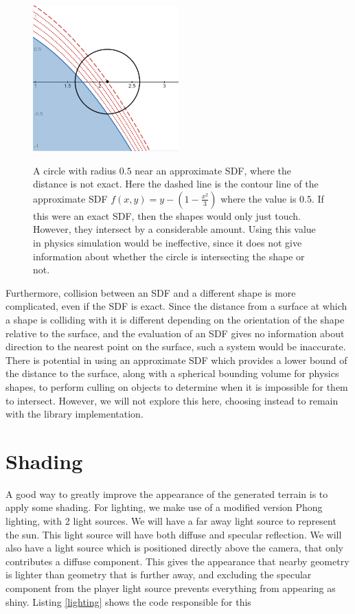\documentclass{article}
\begin{document}
\begin{figure}
  \caption{A circle with radius $0.5$ near an approximate SDF, where the distance is not exact. Here the dashed line is the contour line of the approximate SDF $f\left(x,y\right) = y - \left(1 - \frac{x^2}{3}\right)$ where the value is $0.5$. If this were an exact SDF, then the shapes would only just touch. However, they intersect by a considerable amount. Using this value in physics simulation would be ineffective, since it does not give information about whether the circle is intersecting the shape or not.}
  \includegraphics[width=0.5\textwidth]{approx_collision}
  \label{fig:approx_collision}
\end{figure}

Furthermore, collision between an SDF and a different shape is more complicated, even if the SDF is exact. Since the distance from a surface at which a shape is colliding with it is different depending on the orientation of the shape relative to the surface, and the evaluation of an SDF gives no information about direction to the nearest point on the surface, such a system would be inaccurate. There is potential in using an approximate SDF which provides a lower bound of the distance to the surface, along with a spherical bounding volume for physics shapes, to perform culling on objects to determine when it is impossible for them to intersect. However, we will not explore this here, choosing instead to remain with the library implementation.  

\section{Shading}
A good way to greatly improve the appearance of the generated terrain is to apply some shading. For lighting, we make use of a modified version Phong lighting, with 2 light sources. We will have a far away light source to represent the sun. This light source will have both diffuse and specular reflection. We will also have a light source which is positioned directly above the camera, that only contributes a diffuse component. This gives the appearance that nearby geometry is lighter than geometry that is further away, and excluding the specular component from the player light source prevents everything from appearing as shiny. Listing \ref{lighting} shows the code responsible for this
\end{document}
